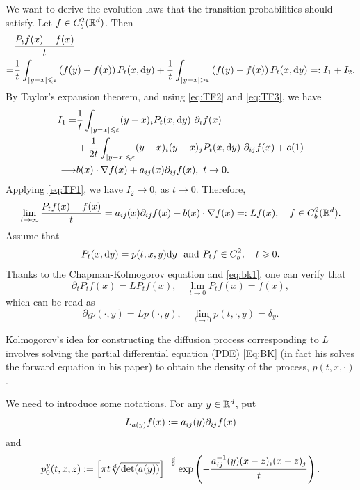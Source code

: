 We want to derive the evolution laws that the transition probabilities should satisfy.  Let \(f\in C_b^2({\mathbb R}^d)\). Then 
\begin{equation*}
    \begin{aligned}
        &\frac{P_tf(x)-f(x)}{t} \\
        =& \frac{1}{t} \int_{|y-x|\leq \eps} \l(f(y)-f(x)\r)P_t(x, \d y) + \frac{1}{t} \int_{|y-x|>\eps} \l(f(y)-f(x)\r)P_t(x, \d y)=:I_1+ I_2. 
    \end{aligned}
\end{equation*}
By Taylor's expansion theorem, and using \eqref{eq:TF2} and \eqref{eq:TF3}, we have 
\begin{align*}
    I_1 =& \frac{1}{t} \int_{|y-x|\leqslant \varepsilon} (y-x)_i P_t(x, \text{\rm{d}} y) ~ \partial_if(x) \\
    &+ \frac{1}{2t} \int_{|y-x|\leqslant \varepsilon} (y-x)_i(y-x)_j P_t(x, \text{\rm{d}} y) ~ \partial_{ij}f(x)  + o(1)\\
    \longrightarrow& b(x)\cdot\nabla f(x)+ a_{ij}(x)\partial_{ij} f(x), ~ t\to 0.
\end{align*}
Applying \eqref{eq:TF1}, we have \(I_2\to 0\), as \(t\to 0\). Therefore, 
\begin{equation}\label{eq:bk1}
    \lim_{t\to\infty}\frac{P_tf(x)-f(x)}{t} = a_{ij}(x)\partial_{ij} f(x)+b(x)\cdot\nabla f(x)=:Lf(x), \quad f\in C^2_b({\mathbb R}^d). 
\end{equation}
Assume that 
\[
P_t(x, \text{\rm{d}} y)=p(t,x,y) \text{\rm{d}} y~ \mbox{ and } P_tf\in C_b^2, \quad t\geqslant 0.
\] 
Thanks to the Chapman-Kolmogorov equation and \eqref{eq:bk1}, one can verify that 
\[
\partial_t P_t f(x) = LP_tf(x), \quad \lim_{t\to 0}P_t f(x)= f(x), 
\]
which can be read as 
\begin{equation}\label{Eq:BK}
    \partial_t p(\cdot,y)=L p(\cdot,y), \quad \lim_{t\to0}p(t,\cdot, y) = \delta_y. 
\end{equation}

Kolmogorov's idea for constructing the diffusion process corresponding to \(L\) involves solving the partial differential equation (PDE) \eqref{Eq:BK} (in fact his solves the forward equation in his paper) to obtain the density of the process, \(p(t, x, \cdot)\).

\medskip

We need to introduce some notations. For any $y\in {\mathbb R}^d$, put 
\[
  L_{a(y)}f(x) := a_{ij}(y)\partial_{ij}f(x) 
\]
and 
$$
p^y_0(t, x, z):=\left[\pi t \sqrt[d]{\det(a(y))}\right]^{-\frac{d}{2}} \exp\left( -\frac{a^{-1}_{ij}(y) (x-z)_i(x-z)_j}{t} \right). 
$$

